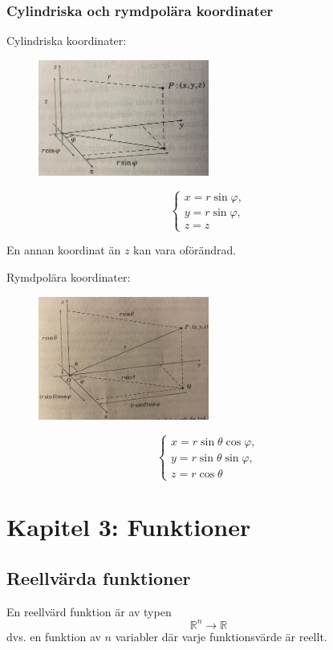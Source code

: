 \documentclass[a4paper,12pt]{article}
\begin{document}
\subsubsection*{Cylindriska och rymdpolära koordinater}
Cylindriska koordinater:
\begin{figure}[H]
  \centering
  \includegraphics[width=0.5\textwidth]{cylindriskakoordinater.png}
  \caption{}
\end{figure}
\[
\begin{cases}
x = r \sin \varphi, \\
y = r \sin \varphi, \\
z = z
\end{cases}
\]

En annan koordinat än $z$ kan vara oförändrad.

Rymdpolära koordinater:
\begin{figure}[H]
  \centering
  \includegraphics[width=0.5\textwidth]{rymdpolarakoordinater.png}
  \caption{}
\end{figure}
\[
\begin{cases}
x = r \sin \theta \cos \varphi, \\
y = r \sin \theta \sin \varphi, \\
z = r \cos \theta
\end{cases}
\]

\section{Kapitel 3: Funktioner}

\subsection{Reellvärda funktioner}
En reellvärd funktion är av typen
\[
\mathbb{R}^n \to \mathbb{R}
\]
dvs. en funktion av $n$ variabler där varje funktionsvärde är reellt.
\end{document}
